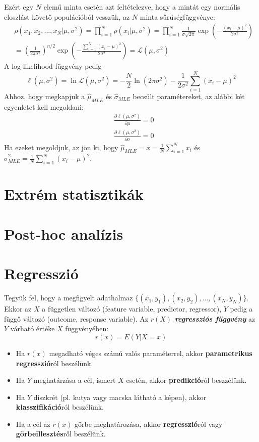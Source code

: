 \documentclass[12pt]{article}
\theoremstyle{plain}
\begin{document}
Ezért egy $N$ elemű minta esetén azt feltételezve, hogy a mintát egy normális eloszlást követő populációból vesszük, 
az $N$ minta sűrűségfüggvénye:
\begin{align*}
  &  \rho(x_1, x_2, ..., x_N | \mu, \sigma^2) = \prod\limits_{i=1}^{N} \rho(x_i|\mu, \sigma^2)
    = \prod\limits_{i=1}^{N} \frac{1}{\sigma\sqrt{2\pi}}\exp\left(-\frac{(x_i-\mu)^2}{2\sigma^2}\right) \\
  & = \left(\frac{1}{2\pi\sigma^2}\right)^{n/2} \exp\left(-\frac{\sum\limits_{i=1}^N(x_i-\mu)^2}{2\sigma^2}\right)
    = \mathcal L(\mu, \sigma^2)
\end{align*}
A log-likelihood függvény pedig
\begin{equation*}
    \ell(\mu, \sigma^2) = \ln \mathcal L(\mu, \sigma^2) =
    -\frac{N}{2}\ln(2\pi\sigma^2) - \frac{1}{2\sigma^2}\sum\limits_{i=1}^{N}(x_i-\mu)^2
\end{equation*}
Ahhoz, hogy megkapjuk a $\hat\mu_{MLE}$ és $\hat\sigma_{MLE}$ becsült paramétereket, az alábbi két egyenletet kell megoldani:
\begin{align*}
    & \frac{\partial \ell(\mu, \sigma^2)}{\partial \mu} = 0 \\
    & \frac{\partial \ell(\mu, \sigma^2)}{\partial \sigma} = 0
\end{align*}
Ha ezeket megoldjuk, az jön ki, hogy $\hat\mu_{MLE} = \overline{x} = \frac{1}{N}\sum\limits_{i=1}^{N}x_i$ és 
$\hat\sigma_{MLE}^2 = \frac{1}{N}\sum\limits_{i=1}^{N}(x_i-\mu)^2$.
\section{Extrém statisztikák}

\section{Post-hoc analízis}
\section{Regresszió}
Tegyük fel, hogy a megfigyelt adathalmaz $\{(x_1, y_1), (x_2, y_2), ..., (x_N, y_N)\}$. Ekkor az $X$ a független változó
(feature variable, predictor, regressor), $Y$ pedig a függő változó (outcome, response variable).
Az \textbf{\textit{$r(X)$ regressziós függvény}} az $Y$ várható értéke $X$ függvényében:
\begin{equation*}
    r(x) = E(Y|X=x)
\end{equation*}
\begin{itemize}
    \item Ha $r(x)$ megadható véges számú valós paraméterrel, akkor \textbf{parametrikus regresszió}ról beszélünk.
    \item Ha $Y$ meghatárzása a cél, ismert $X$ esetén, akkor \textbf{predikció}ról beszzélünk.
    \item Ha $Y$ diszkrét (pl. kutya vagy macska látható a képen), akkor \textbf{klasszifikáció}ról beszélünk.
    \item Ha a cél az $r(x)$ görbe meghatározása, akkor \textbf{regresszió}ról vagy \textbf{görbeillesztés}ről beszélünk.
\end{itemize}
\end{document}
